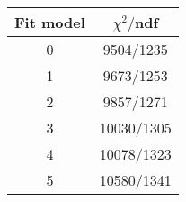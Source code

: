 \begin{tabular}{c|c}
Fit model & $\chi^2/$ndf \\
\hline
0 & 9504/1235\\
1 & 9673/1253\\
2 & 9857/1271\\
3 & 10030/1305\\
4 & 10078/1323\\
5 & 10580/1341\\
\end{tabular}
